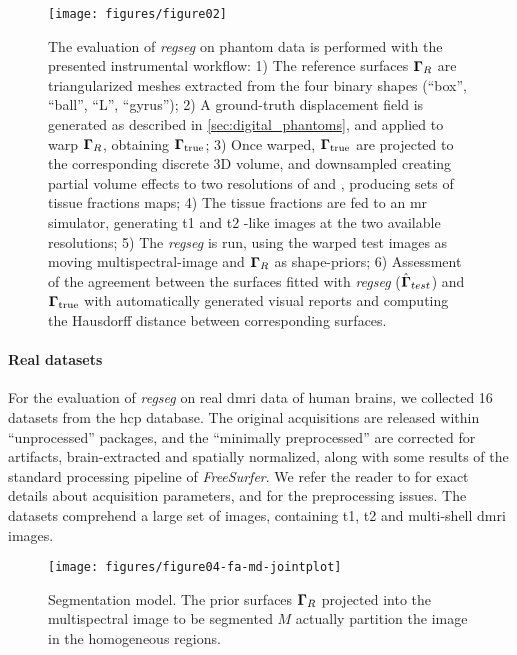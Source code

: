 \begin{figure*}
\texttt{[image: figures/figure02]}
\caption{The evaluation of \emph{regseg} on phantom data is performed with the presented instrumental workflow:
  1) The reference surfaces $\boldsymbol{\Gamma}_R$ are triangularized meshes extracted from the four binary shapes (``box'', ``ball'', ``L'', ``gyrus'');
  2) A ground-truth displacement field is generated as described in \autoref{sec:digital_phantoms}, and applied to warp
      $\boldsymbol{\Gamma}_R$, obtaining $\boldsymbol{\Gamma}_\text{true}$;
  3) Once warped, $\boldsymbol{\Gamma}_\text{true}$ are projected to the corresponding discrete 3D volume, and downsampled creating partial volume effects to two resolutions
     of  and , producing sets of tissue fractions maps;
  4) The tissue fractions are fed to an \acrfull*{mr} simulator, generating \acrfull*{t1} and \acrfull*{t2} -like images at the
     two available resolutions;
  5) The \emph{regseg} is run, using the warped test images as moving multispectral-image and $\boldsymbol{\Gamma}_R$ as shape-priors;
  6) Assessment of the agreement between the surfaces fitted with \emph{regseg} ($\hat{\boldsymbol{\Gamma}}_{test}$) and $\boldsymbol{\Gamma}_\text{true}$
     with automatically generated visual reports and computing the Hausdorff distance between corresponding surfaces.}\label{fig:evphantoms}
\end{figure*}


\paragraph*{Real datasets} %
\label{sec:human_connectome}
% 
For the evaluation of \emph{regseg} on real \gls*{dmri} data of human brains,
  we collected 16 datasets from the \gls*{hcp} database.
The original acquisitions are released within ``unprocessed'' packages, and
  the ``minimally preprocessed'' are corrected for artifacts, brain-extracted
  and spatially normalized, along with some results of the standard processing
  pipeline of \emph{FreeSurfer}.
We refer the reader to \citep{essen_human_2012} for exact details about acquisition
  parameters, and \citep{glasser_minimal_2013} for the preprocessing issues.
The datasets comprehend a large set of images, containing \gls*{t1}, \gls*{t2} and
  multi-shell \gls*{dmri} images.

\begin{figure}
\texttt{[image: figures/figure04-fa-md-jointplot]}
\caption{Segmentation model. The prior surfaces $\boldsymbol{\Gamma}_R$ projected into the
  multispectral image to be segmented $M$ actually partition the image in the
  \omegaset{} homogeneous regions.}\label{fig:model}
\end{figure}

